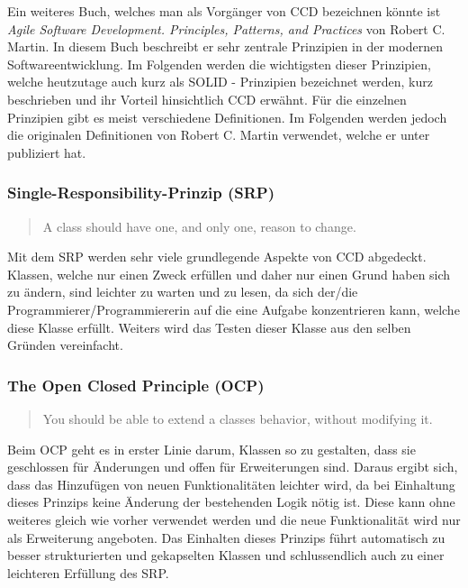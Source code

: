 \SuperPar Ein weiteres Buch, welches man als Vorgänger von CCD bezeichnen könnte ist \textit{Agile Software Development. Principles, Patterns, and Practices} \cite{Martin2002} von Robert C. Martin. In diesem Buch beschreibt er sehr zentrale Prinzipien in der modernen Softwareentwicklung. Im Folgenden werden die wichtigsten dieser Prinzipien, welche heutzutage auch kurz als SOLID - Prinzipien bezeichnet werden, kurz beschrieben und ihr Vorteil hinsichtlich CCD erwähnt. Für die einzelnen Prinzipien gibt es meist verschiedene Definitionen. Im Folgenden werden jedoch die originalen Definitionen von Robert C. Martin verwendet, welche er unter \cite{Martin2016} publiziert hat. 

\subsubsection{Single-Responsibility-Prinzip (SRP)}
\begin{quotation}
	A class should have one, and only one, reason to change.
\end{quotation}

Mit dem SRP werden sehr viele grundlegende Aspekte von CCD abgedeckt. Klassen, welche nur einen Zweck erfüllen und daher nur einen Grund haben sich zu ändern, sind leichter zu warten und zu lesen, da sich der/die Programmierer/Programmiererin auf die eine Aufgabe konzentrieren kann, welche diese Klasse erfüllt. Weiters wird das Testen dieser Klasse aus den selben Gründen vereinfacht. 

\subsubsection{The Open Closed Principle (OCP)}
\begin{quotation}
	You should be able to extend a classes behavior, without modifying it.
\end{quotation}

Beim OCP geht es in erster Linie darum, Klassen so zu gestalten, dass sie geschlossen für Änderungen und offen für Erweiterungen sind. 
Daraus ergibt sich, dass das Hinzufügen von neuen Funktionalitäten leichter wird, da bei Einhaltung dieses Prinzips keine Änderung der bestehenden Logik nötig ist. Diese kann ohne weiteres gleich wie vorher verwendet werden und die neue Funktionalität wird nur als Erweiterung angeboten. Das Einhalten dieses Prinzips führt automatisch zu besser strukturierten und gekapselten Klassen und schlussendlich auch zu einer leichteren Erfüllung des SRP.

